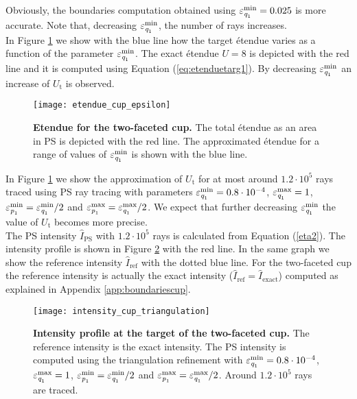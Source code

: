  Obviously, the boundaries computation obtained using $\varepsilon_{\textit{q}_1}^{\textrm{min}} = 0.025$ is more accurate. 
Note that, decreasing $\varepsilon_{\textit{q}_1}^{\textrm{min}}$, the number of rays increases. 
\\ \indent In Figure \ref{fig:etendue_cup} we show with the blue line how the target \'{e}tendue varies as a function of the parameter $\varepsilon_{\textit{q}_1}^{\textrm{min}}$. The exact \'{e}tendue $U=8$ is depicted with the red line and it is computed using Equation (\ref{eq:etenduetarg1}). By decreasing $\varepsilon_{\textit{q}_1}^{\textrm{min}}$ an increase of $U_{\textrm{t}}$ is observed. %
 \begin{figure}[t]
  \center
  \texttt{[image: etendue\_cup\_epsilon]}
  \caption{\textbf{Etendue for the two-faceted cup.} The total \'{e}tendue as an area in PS is depicted with the red line. The approximated \'{e}tendue for a range of values of 
$\varepsilon_{\textit{q}_1}^{\textrm{min}}$ is shown with the blue line.}
  \label{fig:etendue_cup}
\end{figure}
In Figure \ref{fig:etendue_cup} we show the approximation of $U_{\textrm{t}}$ for at most around $1.2 \cdot 10^5$ rays traced using PS ray tracing with parameters $\varepsilon_{\textit{q}_1}^{\textrm{min}}=0.8\cdot 10^{-4}$, $\varepsilon_{\textit{q}_1}^{\textrm{max}}=1$, $\varepsilon_{\textit{p}_1}^{\textrm{min}}=\varepsilon_{\textit{q}_1}^{\textrm{min}}/2$ and $\varepsilon_{\textit{p}_1}^{\textrm{max}}= \varepsilon_{\textit{q}_1}^{\textrm{max}}/2$. We expect that further decreasing $\varepsilon_{\textit{q}_1}^{\textrm{min}}$ the value of $U_{\textrm{t}}$ becomes more precise. 
\\ \indent The PS intensity $\hat{I}_{\textrm{PS}}$ with $1.2 \cdot 10^5$ rays is calculated from Equation (\ref{eta2}). The intensity profile is shown in Figure \ref{fig:intensity_cup_triangulation} with the red line. In the same graph we show the reference intensity $\hat{I}_{\textrm{ref}}$ with the dotted blue line. For the two-faceted cup the reference intensity is actually the exact intensity ($\hat{I}_{\textrm{ref}}= \hat{I}_{\textrm{exact}}$) computed as explained in Appendix \ref{app:boundariescup}. 
 \begin{figure}[t]
  \center
  \texttt{[image: intensity\_cup\_triangulation]}
  \caption{\textbf{Intensity profile at the target of the two-faceted cup.} The reference intensity is the exact intensity. The PS intensity is computed using the triangulation refinement with $\varepsilon_{\textit{q}_1}^{\textrm{min}}=0.8\cdot 10^{-4}$, $\varepsilon_{\textit{q}_1}^{\textrm{max}}=1$, $\varepsilon_{\textit{p}_1}^{\textrm{min}}=\varepsilon_{\textit{q}_1}^{\textrm{min}}/2$ and $\varepsilon_{\textit{p}_1}^{\textrm{max}}= \varepsilon_{\textit{q}_1}^{\textrm{max}}/2$. Around $1.2 \cdot 10^5$ rays are traced.}
  \label{fig:intensity_cup_triangulation}
\end{figure}
